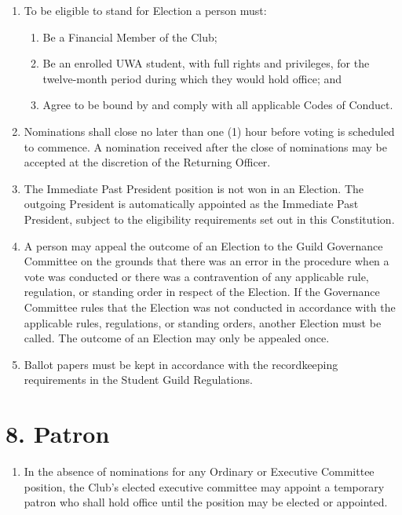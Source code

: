 \documentclass[12pt]{article}
\begin{document}
\begin{enumerate}[label=7.\arabic*]
\item To be eligible to stand for Election a person must:
  \begin{enumerate}[label=7.9.\arabic*]
    \item Be a Financial Member of the Club;
    \item Be an enrolled UWA student, with full rights and privileges, for the twelve-month period during which they would hold office; and
    \item Agree to be bound by and comply with all applicable Codes of Conduct.
  \end{enumerate}

\item Nominations shall close no later than one (1) hour before voting is scheduled to commence. A nomination received after the close of nominations may be accepted at the discretion of the Returning Officer.

\item The Immediate Past President position is not won in an Election. The outgoing President is automatically appointed as the Immediate Past President, subject to the eligibility requirements set out in this Constitution.

\item A person may appeal the outcome of an Election to the Guild Governance Committee on the grounds that there was an error in the procedure when a vote was conducted or there was a contravention of any applicable rule, regulation, or standing order in respect of the Election. If the Governance Committee rules that the Election was not conducted in accordance with the applicable rules, regulations, or standing orders, another Election must be called. The outcome of an Election may only be appealed once.

\item Ballot papers must be kept in accordance with the recordkeeping requirements in the Student Guild Regulations.
\end{enumerate}

\section{8. Patron}
\begin{enumerate}[label=8.\arabic*]
 \item In the absence of nominations for any Ordinary or Executive Committee position, the Club’s elected executive committee may appoint a temporary patron who shall hold office until the position may be elected or appointed.
\end{enumerate}
%
\end{document}
